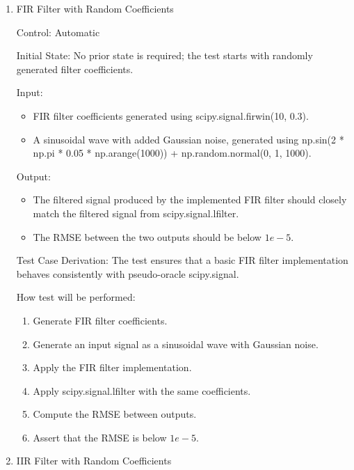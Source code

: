 \documentclass[12pt, titlepage]{article}
\begin{document}

\begin{enumerate}

\item{FIR Filter with Random Coefficients\\}

Control: Automatic
					
Initial State: No prior state is required; the test starts with randomly
generated filter coefficients.
					
Input:
\begin{itemize}
  \item FIR filter coefficients generated using scipy.signal.firwin(10, 0.3).
  \item A sinusoidal wave with added Gaussian noise, generated using np.sin(2 *
  np.pi * 0.05 * np.arange(1000)) + np.random.normal(0, 1, 1000).
\end{itemize}

Output:
\begin{itemize}
  \item The filtered signal produced by the implemented FIR filter should
  closely match the filtered signal from scipy.signal.lfilter.
  \item The RMSE between the two outputs should be below $1e-5$.
\end{itemize}

Test Case Derivation: The test ensures that a basic FIR filter implementation
behaves consistently with pseudo-oracle scipy.signal.
					
How test will be performed: 
\begin{enumerate}
  \item Generate FIR filter coefficients.
  \item Generate an input signal as a sinusoidal wave with Gaussian noise.
  \item Apply the FIR filter implementation.
  \item Apply scipy.signal.lfilter with the same coefficients.
  \item Compute the RMSE between outputs.
  \item Assert that the RMSE is below $1e-5$.
\end{enumerate}
					
\item{IIR Filter with Random Coefficients\\}


\end{enumerate}
\end{document}

